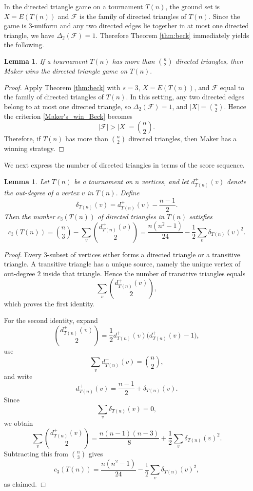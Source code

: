 \documentclass{article}
\theoremstyle{definition}
\theoremstyle{plain}
\newtheorem{lem}[theo]{Lemma}
\theoremstyle{remark}
\theoremstyle{definition}
\begin{document}
In the directed triangle game on a tournament $T(n)$, the ground set is $X=E(T(n))$ and
$\mathcal F$ is the family of directed triangles of $T(n)$.
Since the game is $3$-uniform and any two directed edges lie together in at most one directed triangle, we have
$\Delta_2(\mathcal F)=1$.
Therefore Theorem \ref{thm:beck} immediately yields the following.


\begin{lem}\label{lem:many-triangles-maker-win}
If a tournament $T(n)$ has more than $\binom{n}{2}$ directed triangles, then Maker wins the directed triangle game on $T(n)$.

\end{lem}
\begin{proof}
Apply Theorem \ref{thm:beck} with $s=3$, $X=E(T(n))$, and $\mathcal F$ equal to the family of directed triangles of $T(n)$. In this setting, any two directed edges belong to at most one directed triangle, so $\Delta_2(\mathcal F)=1$, and $|X|=\binom{n}{2}$. Hence the criterion \eqref{Maker's_win_Beck} becomes
\[
|\mathcal F|>|X|=\binom{n}{2}.
\]
Therefore, if $T(n)$ has more than $\binom{n}{2}$ directed triangles, then Maker has a winning strategy.
\end{proof}

We next express the number of directed triangles in terms of the score sequence.


\begin{lem}\label{lem:triangle-count-by-scores}
Let $T(n)$ be a tournament on $n$ vertices, and let $d_{T(n)}^+(v)$ denote the out-degree of a vertex $v$ in $T(n)$.
Define
\[
\delta_{T(n)}(v)=d_{T(n)}^+(v)-\frac{n-1}{2}.
\]
Then the number $c_3(T(n))$ of directed triangles in $T(n)$ satisfies
\[
c_3(T(n))
=
\binom{n}{3}
-
\sum_v \binom{d_{T(n)}^+(v)}{2}
=
\frac{n(n^2-1)}{24}
-\frac12\sum_v \delta_{T(n)}(v)^2.
\]
\end{lem}

\begin{proof}
Every $3$-subset of vertices either forms a directed triangle or a transitive triangle.
A transitive triangle has a unique source, namely the unique vertex of out-degree $2$ inside that triangle.
Hence the number of transitive triangles equals
\[
\sum_v \binom{d_{T(n)}^+(v)}{2},
\]
which proves the first identity.

For the second identity, expand
\[
\binom{d_{T(n)}^+(v)}{2}
=
\frac12 d_{T(n)}^+(v)\bigl(d_{T(n)}^+(v)-1\bigr),
\]
use
\[
\sum_v d_{T(n)}^+(v)=\binom{n}{2},
\]
and write
\[
d_{T(n)}^+(v)=\frac{n-1}{2}+\delta_{T(n)}(v).
\]
Since
\[
\sum_v \delta_{T(n)}(v)=0,
\]
we obtain
\[
\sum_v \binom{d_{T(n)}^+(v)}{2}
=
\frac{n(n-1)(n-3)}{8}
+
\frac12\sum_v \delta_{T(n)}(v)^2.
\]
Subtracting this from $\binom{n}{3}$ gives
\[
c_3(T(n))
=
\frac{n(n^2-1)}{24}
-
\frac12\sum_v \delta_{T(n)}(v)^2,
\]
as claimed.

\end{proof}
\end{document}
